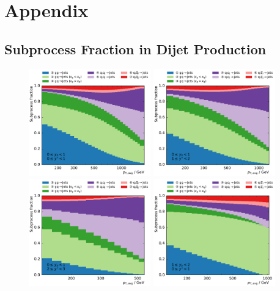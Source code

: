 
\chapter{Appendix}
\label{ch:app:physics}
\clearpage

\section{Subprocess Fraction in Dijet Production}
\begin{figure}[H]
    \centering
    \includegraphics[width=0.47\textwidth]{figures/theory/subprocesses_yb0ys0.pdf}\hfill
    \includegraphics[width=0.47\textwidth]{figures/theory/subprocesses_yb0ys1.pdf}\hfill
    \includegraphics[width=0.47\textwidth]{figures/theory/subprocesses_yb0ys2.pdf}\hfill
    \includegraphics[width=0.47\textwidth]{figures/theory/subprocesses_yb1ys0.pdf}\hfill

\end{figure}
